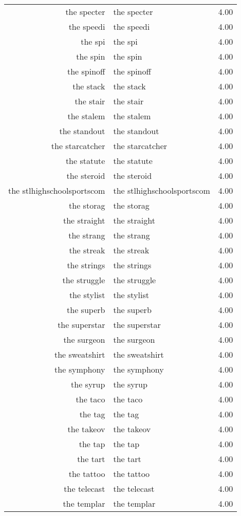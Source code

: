 \begin{table}[ht]
\begin{tabular}{rlr}
  the specter & the specter & 4.00 \\ 
  the speedi & the speedi & 4.00 \\ 
  the spi & the spi & 4.00 \\ 
  the spin & the spin & 4.00 \\ 
  the spinoff & the spinoff & 4.00 \\ 
  the stack & the stack & 4.00 \\ 
  the stair & the stair & 4.00 \\ 
  the stalem & the stalem & 4.00 \\ 
  the standout & the standout & 4.00 \\ 
  the starcatcher & the starcatcher & 4.00 \\ 
  the statute & the statute & 4.00 \\ 
  the steroid & the steroid & 4.00 \\ 
  the stlhighschoolsportscom & the stlhighschoolsportscom & 4.00 \\ 
  the storag & the storag & 4.00 \\ 
  the straight & the straight & 4.00 \\ 
  the strang & the strang & 4.00 \\ 
  the streak & the streak & 4.00 \\ 
  the strings & the strings & 4.00 \\ 
  the struggle & the struggle & 4.00 \\ 
  the stylist & the stylist & 4.00 \\ 
  the superb & the superb & 4.00 \\ 
  the superstar & the superstar & 4.00 \\ 
  the surgeon & the surgeon & 4.00 \\ 
  the sweatshirt & the sweatshirt & 4.00 \\ 
  the symphony & the symphony & 4.00 \\ 
  the syrup & the syrup & 4.00 \\ 
  the taco & the taco & 4.00 \\ 
  the tag & the tag & 4.00 \\ 
  the takeov & the takeov & 4.00 \\ 
  the tap & the tap & 4.00 \\ 
  the tart & the tart & 4.00 \\ 
  the tattoo & the tattoo & 4.00 \\ 
  the telecast & the telecast & 4.00 \\ 
  the templar & the templar & 4.00 \\ 

\end{tabular}
\end{table}
